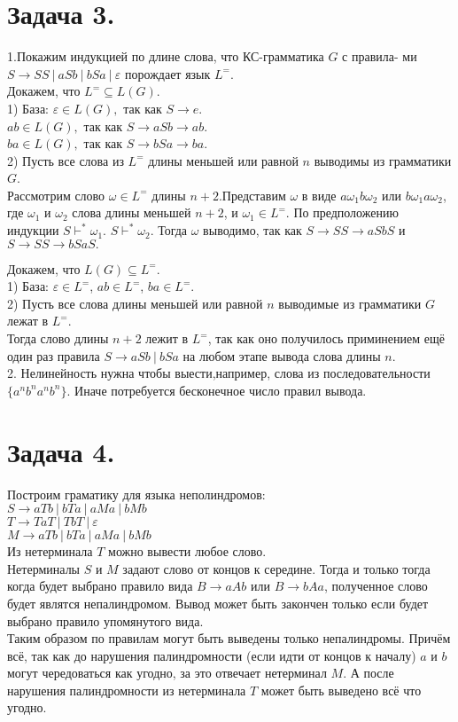 \documentclass[12pt]{article}
\theoremstyle{definition}
\theoremstyle{definition}
\let\ra\rightarrow
\let\eps\varepsilon
\let\o\omega
\begin{document}
\section*{Задача  3.}
1.Покажим индукцией по длине слова, что КС-грамматика $G$ с правила-
ми $S \ra SS\ |\ aSb\ |\ bSa\ |\ \eps$ порождает язык $L^=$.\\
Докажем, что $L^= \subseteq L(G)$.\\
1) База: $\eps \in L(G),$ так как $S \ra e$. \\
\hspace*{0,5cm}$ab \in L(G),$ так как $S\ra aSb \ra ab$.\\
\hspace*{0,5cm}$ba \in L(G),$ так как $S\ra bSa \ra ba$.\\
2) Пусть все слова из $L^=$ длины меньшей или равной $n$ выводимы из грамматики $G$.\\
Рассмотрим слово  $\o \in L^=$ длины $n+2$.Представим $\o$ в виде $a\o_1b\o_2$ или $b\o_1a\o_2$, где $\o_1$ и $\o_2$ слова длины меньшей $n+2$, и $\o_1 \in L^=$. По предположению индукции $S \vdash^*\o_1$. $S \vdash^*\o_2$. Тогда $\o$ выводимо, так как $S \ra SS \ra aSbS$ и $S \ra SS \ra bSaS.$


Докажем, что $L(G) \subseteq L^=$.\\
1) База: $\eps \in L^=$, $ab \in L^=$, $ba \in L^=$.\\
2) Пусть все слова длины меньшей или равной $n$ выводимые из грамматики $G$  лежат в $ L^=$.\\ Тогда слово длины $n+2$ лежит в $L^=$, так как оно получилось приминением ещё один раз правила $S \ra aSb\ |\ bSa$ на любом этапе вывода слова длины $n$. \\

2. Нелинейность нужна чтобы выести,например, слова из последовательности $\{a^nb^na^nb^n\}$. Иначе потребуется бесконечное число правил вывода.

\section*{Задача  4.}
Построим граматику для языка неполиндромов:\\
$S \ra aTb\ |\ bTa\ |\ aMa\ |\ bMb$\\
$T \ra TaT\ |\ TbT\ |\ \eps$\\
$M \ra aTb\ |\ bTa\ |\ aMa\ |\ bMb$\\
Из нетерминала $T$ можно вывести любое слово.\\
Нетерминалы $S$ и $M$ задают слово от концов к середине. Тогда и только тогда когда будет выбрано правило вида $B \ra aAb$ или $B \ra bAa$, полученное слово будет являтся непалиндромом. Вывод может быть закончен только если будет выбрано правило упомянутого вида.\\ Таким образом по правилам могут быть выведены только непалиндромы. Причём всё, так как до нарушения палиндромности (если идти от концов к началу) $a$ и $b$ могут чередоваться как угодно, за это отвечает нетерминал $M$. А после нарушения палиндромности из нетерминала $T$ может быть выведено всё что угодно.
\end{document}
